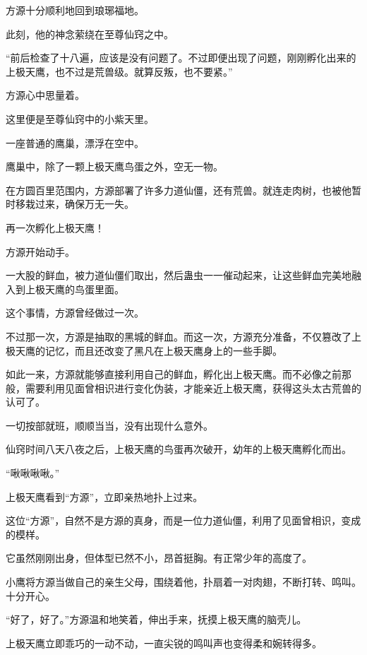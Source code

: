
\begin{this_body}



方源十分顺利地回到琅琊福地。

此刻，他的神念萦绕在至尊仙窍之中。

“前后检查了十八遍，应该是没有问题了。不过即便出现了问题，刚刚孵化出来的上极天鹰，也不过是荒兽级。就算反叛，也不要紧。”

方源心中思量着。

这里便是至尊仙窍中的小紫天里。

一座普通的鹰巢，漂浮在空中。

鹰巢中，除了一颗上极天鹰鸟蛋之外，空无一物。

在方圆百里范围内，方源部署了许多力道仙僵，还有荒兽。就连走肉树，也被他暂时移栽过来，确保万无一失。

再一次孵化上极天鹰！

方源开始动手。

一大股的鲜血，被力道仙僵们取出，然后蛊虫一一催动起来，让这些鲜血完美地融入到上极天鹰的鸟蛋里面。

这个事情，方源曾经做过一次。

不过那一次，方源是抽取的黑城的鲜血。而这一次，方源充分准备，不仅篡改了上极天鹰的记忆，而且还改变了黑凡在上极天鹰身上的一些手脚。

如此一来，方源就能够直接利用自己的鲜血，孵化出上极天鹰。而不必像之前那般，需要利用见面曾相识进行变化伪装，才能亲近上极天鹰，获得这头太古荒兽的认可了。

一切按部就班，顺顺当当，没有出现什么意外。

仙窍时间八天八夜之后，上极天鹰的鸟蛋再次破开，幼年的上极天鹰孵化而出。

“啾啾啾啾。”

上极天鹰看到“方源”，立即亲热地扑上过来。

这位“方源”，自然不是方源的真身，而是一位力道仙僵，利用了见面曾相识，变成的模样。

它虽然刚刚出身，但体型已然不小，昂首挺胸。有正常少年的高度了。

小鹰将方源当做自己的亲生父母，围绕着他，扑扇着一对肉翅，不断打转、鸣叫。十分开心。

“好了，好了。”方源温和地笑着，伸出手来，抚摸上极天鹰的脑壳儿。

上极天鹰立即乖巧的一动不动，一直尖锐的鸣叫声也变得柔和婉转得多。


\end{this_body}
